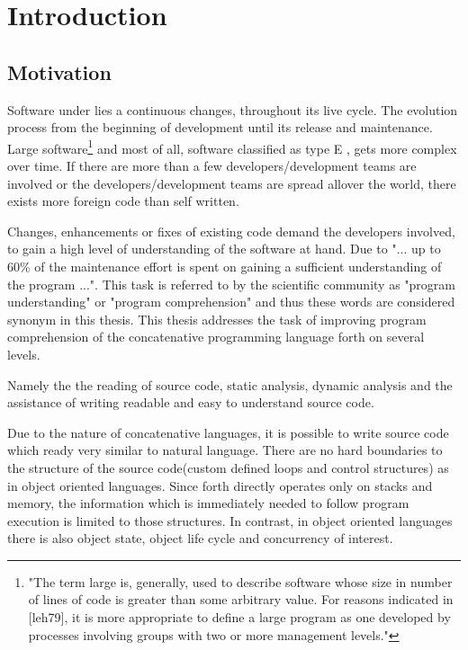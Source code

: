 

\chapter{Introduction}

\section*{Motivation}

Software under lies a continuous changes, throughout its live cycle.
The evolution process from the beginning of development until its release and maintenance. Large software\footnote{"The term large is, generally, used to describe software whose size in number of lines of code is greater than some arbitrary value. For reasons indicated in [leh79], it is more appropriate to define a large program as one developed by processes involving groups with two or more management levels."\cite{Lehman:2003:SEB:950401.950407}} and most of all, software  classified as type E \cite{Cook:2006:ESS:1115566.1115567}, gets more complex over time. If there are more than a few developers/development teams are involved or the developers/development teams are spread allover the world, there exists more foreign code than self written.

Changes, enhancements or fixes of existing code demand the developers involved, to gain a high level of understanding of the software at hand\cite{Boehm:1976:SE:1311958.1312684}\cite{Singer97anexamination}. Due to \cite{Cornelissen:2009:SSP:1638616.1639301} "... up to 60\% of the maintenance effort is spent on gaining a sufficient understanding of the program ...". This task is referred to by the scientific community as "program understanding" or "program comprehension" and thus these words are considered synonym in this thesis. This thesis addresses the task of improving program comprehension of the concatenative programming language forth on several levels.

Namely the the reading of source code, static analysis, dynamic analysis and the assistance of writing readable and easy to understand source code.

Due to the nature of concatenative languages, it is possible to write source code which ready very similar to natural language. There are no hard boundaries to the structure of the source code(custom defined loops and control structures) as in object oriented languages. Since forth directly operates only on stacks and memory, the information which is immediately needed to follow program execution is limited to those structures. In contrast, in object oriented languages there is also object state, object life cycle and concurrency of interest.


